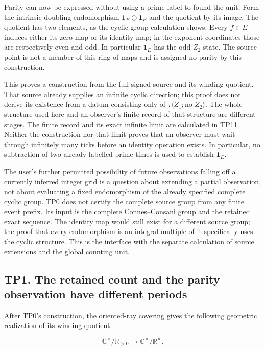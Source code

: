 \documentclass[
]{article}
\begin{document}
Parity can now be expressed without using a prime label to found the
unit. Form the intrinsic doubling endomorphism
\(\mathbf1_E\oplus\mathbf1_E\) and the quotient by its image. The
quotient has two elements, as the cyclic-group calculation shows. Every
\(f\in E\) induces either its zero map or its identity map; in the
exponent coordinates those are respectively even and odd. In particular
\(\mathbf1_E\) has the odd \(Z_2\) state. The source point is not a
member of this ring of maps and is assigned no parity by this
construction.

This proves a construction from the full signed source and its winding
quotient. That source already supplies an infinite cyclic direction;
this proof does not derive its existence from a datum consisting only of
\(\tau\langle Z_1;\text{no }Z_2\rangle\). The whole structure used here
and an observer's finite record of that structure are different stages.
The finite record and its exact infinite limit are calculated in TP11.
Neither the construction nor that limit proves that an observer must
wait through infinitely many ticks before an identity operation exists.
In particular, no subtraction of two already labelled prime times is
used to establish \(\mathbf1_E\).

The user's further permitted possibility of future observations falling
off a currently inferred integer grid is a question about extending a
partial observation, not about evaluating a fixed endomorphism of the
already specified complete cyclic group. TP0 does not certify the
complete source group from any finite event prefix. Its input is the
complete Connes--Consani group and the retained exact sequence. The
identity map would still exist for a different source group; the proof
that every endomorphism is an integral multiple of it specifically uses
the cyclic structure. This is the interface with the separate
calculation of source extensions and the global counting unit.

\subsection{TP1. The retained count and the parity observation have
different
periods}\label{tp1.-the-retained-count-and-the-parity-observation-have-different-periods}

After TP0's construction, the oriented-ray covering gives the following
geometric realization of its winding quotient:

\[
\mathbb C^\times/\mathbb R_{>0}\longrightarrow
\mathbb C^\times/\mathbb R^\times.
\]
\end{document}
